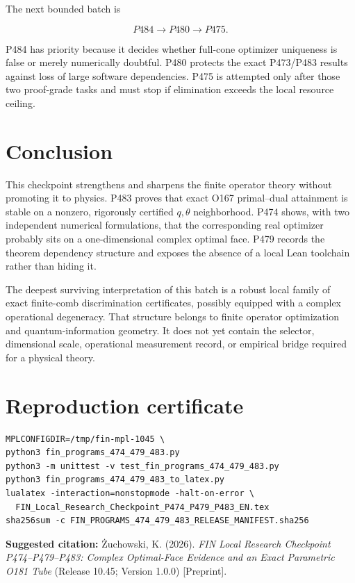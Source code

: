 \documentclass[11pt,a4paper,openany]{report}
\begin{document}
The next bounded batch is

\[
\boxed{P484\longrightarrow P480\longrightarrow P475}.
\]

P484 has priority because it decides whether full-cone optimizer uniqueness is false or merely numerically doubtful. P480 protects the exact P473/\allowbreak{}P483 results against loss of large software dependencies. P475 is attempted only after those two proof-grade tasks and must stop if elimination exceeds the local resource ceiling.

\chapter{Conclusion}

This checkpoint strengthens and sharpens the finite operator theory without promoting it to physics. P483 proves that exact O167 primal--dual attainment is stable on a nonzero, rigorously certified \(q,\theta\) neighborhood. P474 shows, with two independent numerical formulations, that the corresponding real optimizer probably sits on a one-dimensional complex optimal face. P479 records the theorem dependency structure and exposes the absence of a local Lean toolchain rather than hiding it.

The deepest surviving interpretation of this batch is a robust local family of exact finite-comb discrimination certificates, possibly equipped with a complex operational degeneracy. That structure belongs to finite operator optimization and quantum-information geometry. It does not yet contain the selector, dimensional scale, operational measurement record, or empirical bridge required for a physical theory.


\clearpage\chapter*{Reproduction certificate}
\begin{Verbatim}[fontsize=\small]
MPLCONFIGDIR=/tmp/fin-mpl-1045 \
python3 fin_programs_474_479_483.py
python3 -m unittest -v test_fin_programs_474_479_483.py
python3 fin_programs_474_479_483_to_latex.py
lualatex -interaction=nonstopmode -halt-on-error \
  FIN_Local_Research_Checkpoint_P474_P479_P483_EN.tex
sha256sum -c FIN_PROGRAMS_474_479_483_RELEASE_MANIFEST.sha256
\end{Verbatim}
\noindent\textbf{Suggested citation:}
\.Zuchowski, K. (2026). \emph{FIN Local Research Checkpoint
P474--P479--P483: Complex Optimal-Face Evidence and an Exact Parametric O181
Tube} (Release 10.45; Version 1.0.0) [Preprint].
\end{document}
